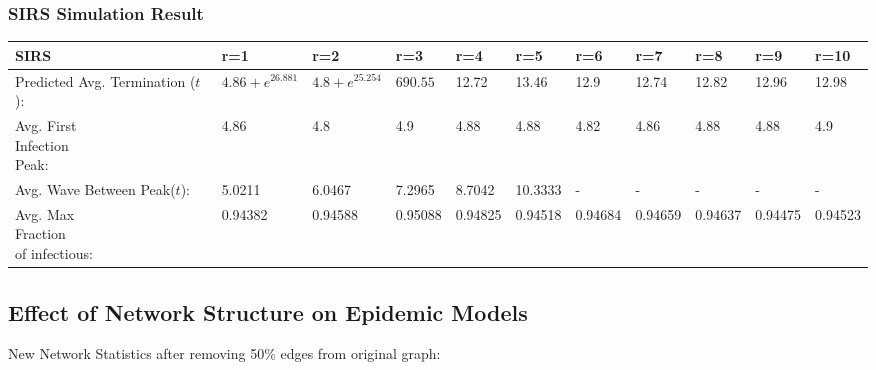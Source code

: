 \documentclass{subfile}
\begin{document}
  \subsubsection{SIRS Simulation Result}
  \begin{adjustbox}{max width=1.2\textwidth,center}
    \begin{tabular}{|l|l|l|l|l|l|l|l|l|l|l|}
      \hline
      SIRS & r=1 & r=2 & r=3 & r=4 & r=5 & r=6 & r=7 & r=8 & r=9& r=10\\
      \hline
      \makecell{Predicted\\Avg.\\Termination\\(\(t\)):} & \(4.86 + e^{26.881}\) & \(4.8 + e^{25.254}\) & \(690.55\)\footnotemark & 12.72\footnotemark & 13.46& 12.9& 12.74& 12.82& 12.96& 12.98\\
      \hline
      \makecell{Avg. First\\Infection\\Peak:} & 4.86& 4.8& 4.9& 4.88& 4.88& 4.82& 4.86& 4.88& 4.88& 4.9\\
      \hline
      \makecell{Avg. Wave\\Between Peak(\(t\)):}\footnotemark & 5.0211& 6.0467& 7.2965& 8.7042& 10.3333 & - & - & - & - & -\\
      \hline
      \makecell{Avg. Max\\Fraction\\of infectious:}& 0.94382& 0.94588& 0.95088& 0.94825& 0.94518& 0.94684& 0.94659& 0.94637& 0.94475& 0.94523\\
      \hline
    \end{tabular}
  \end{adjustbox}

  \subsection{Effect of Network Structure on Epidemic Models}
  New Network Statistics after removing 50\% edges from original graph:

  ~
\end{document}
